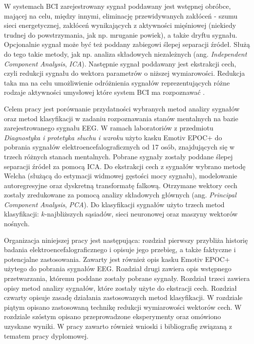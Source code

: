 \documentclass[notitlepage]{report}
\begin{document}
W systemach BCI zarejestrowany sygnał poddawany jest wstępnej obróbce, mającej na celu, między innymi, eliminację przewidywanych zakłóceń - szumu sieci energetycznej, zakłóceń wynikających z aktywności mięśniowej (niekiedy trudnej do powstrzymania, jak np. mruganie powiek), a także dryftu sygnału. Opcjonalnie sygnał może być też poddany zabiegowi ślepej separacji źródeł. Służą do tego takie metody, jak np. analiza składowych niezależnych (ang. \textit{Independent Component Analysis}, \textit{ICA}). Następnie sygnał poddawany jest ekstrakcji cech, czyli redukcji sygnału do wektora parametrów o niższej wymiarowości. Redukcja taka ma na celu umożliwienie odróżnienia sygnałów reprezentujących różne rodzaje aktywności umysłowej które system BCI ma rozpoznawać \cite{nicolasalonso} \cite{lotte2}.

Celem pracy jest porównanie przydatności wybranych metod analizy sygnałów oraz metod klasyfikacji w zadaniu rozpoznawania stanów mentalnych na bazie zarejestrowanego sygnału EEG. W ramach laboratoriów z przedmiotu \textit{Diagnostyka i protetyka słuchu i wzroku} użyto kasku Emotiv EPOC+ do pobrania sygnałów elektroencefalograficznych od 17 osób, znajdujących się w trzech różnych stanach mentalnych. Pobrane sygnały zostały poddane ślepej separacji źródeł za pomocą ICA. Do ekstrakcji cech z sygnałów wybrano metodę Welcha (służącą do estymacji widmowej gęstości mocy sygnału), modelowanie autoregresyjne oraz dyskretną transformatę falkową. Otrzymane wektory cech zostały zredukowane za pomocą analizy składowych głównych (ang. \textit{Principal Component Analysis}, \textit{PCA}). Do klasyfikacji sygnałów użyto trzech metod klasyfikacji: $k$-najbliższych sąsiadów, sieci neuronowej oraz maszyny wektorów nośnych. 

Organizacja niniejszej pracy jest następująca: rozdział pierwszy przybliża historię badania elektroencefalograficznego i opisuje jego przebieg, a także faktyczne i potencjalne zastosowania. Zawarty jest również opis kasku Emotiv EPOC+ użytego do pobrania sygnałów EEG. Rozdział drugi zawiera opis wstępnego przetwarzania, któremu poddane zostały pobrane sygnały.
Rozdział trzeci zawiera opisy metod analizy sygnałów, które zostały użyte do ekstracji cech. Rozdział czwarty opisuje zasadę działania zastosowanych metod klasyfikacji. W rozdziale piątym opisano zastosowaną technikę redukcji wymiarowości wektorów cech. W rozdziale szóstym opisano przeprowadzone eksperymenty oraz omówiono uzyskane wyniki. W pracy zawarto również wnioski i bibliografię związaną z tematem pracy dyplomowej.
\end{document}

